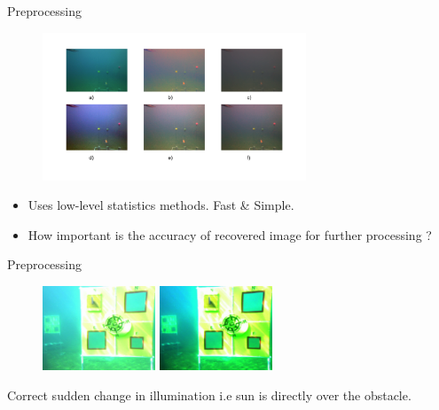 \documentclass{beamer}
\begin{document}
\begin{frame}{Preprocessing}
    \begin{figure}[ht]
        \includegraphics[width=0.7\textwidth, height=0.5\textheight]{figs/color_constancy.png}
    \end{figure}
    \begin{itemize}
        \item Uses low-level statistics methods. Fast \& Simple.
        \item How important is the accuracy of recovered image for further processing ?
    \end{itemize}
\end{frame}

\begin{frame}{Preprocessing}
    \begin{figure}[ht]
        \centering
        \includegraphics[width=0.3\textwidth, height=0.3\textheight]{figs/robosub16_torpedo_orange_yellow_superbright.png}\hspace{5em}
        \includegraphics[width=0.3\textwidth, height=0.3\textheight]{figs/robosub16_torpedo_orange_yellow_superbright_gamma_correct.png}
    \end{figure}
    Correct sudden change in illumination i.e sun is directly over the obstacle.
\end{frame}
\end{document}
